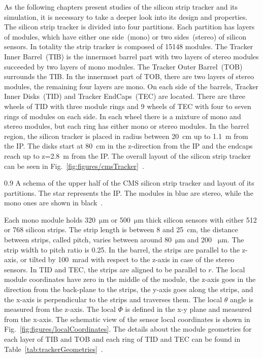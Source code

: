 As the following chapters present studies of the silicon strip tracker and its simulation, it is necessary to take a deeper look into its design and properties. The silicon strip tracker is divided into four partitions. Each partition has layers of modules, which have either one side~(mono) or two sides~(stereo) of silicon sensors. In totality the strip tracker is composed of 15148 modules. The Tracker Inner Barrel~(TIB) is the innermost barrel part with two layers of stereo modules succeeded by two layers of mono modules. The Tracker Outer Barrel~(TOB) surrounds the TIB. In the innermost part of TOB, there are two layers of stereo modules, the remaining four layers are mono. On each side of the barrels, Tracker Inner Disks~(TID) and Tracker EndCaps~(TEC) are located. There are three wheels of TID with three module rings and 9 wheels of TEC with four to seven rings of modules on each side. In each wheel there is a mixture of mono and stereo modules, but each ring has either mono or stereo modules. In the barrel region, the silicon tracker is placed in radius between 20~cm up to 1.1~m from the IP. The disks start at 80~cm in the z-direction from the IP and the endcaps reach up to z=2.8~m from the IP. The overall layout of the silicon strip tracker can be seen in Fig.~\ref{fig:figures/cmsTracker}~\cite{Chatrchyan:2014fea}.

                 {0.9}       
                 {A schema of the upper half of the CMS silicon strip tracker and layout of its partitions. The star represents the IP. The modules in blue are stereo, while the mono ones are shown in black~\cite{Chatrchyan:2014fea}. }

Each mono module holds 320~$\mathrm{\mu m}$ or 500~$\mathrm{\mu m}$ thick silicon sensors with either 512 or 768 silicon strips.  The strip length is between 8 and 25~cm, the distance between strips, called pitch, varies between around 80~$\mathrm{\mu m}$ and 200 ~$\mathrm{\mu m}$. The strip width to pitch ratio is 0.25. In the barrel, the strips are parallel to the z-axis, or tilted by 100~mrad with respect to the z-axis in case of the stereo sensors. In TID and TEC, the strips are aligned to be parallel to $r$. The local module coordinates have zero in the middle of the module, the z-axis goes in the direction from the back-plane to the strips, the y-axis goes along the strips, and the x-axis is perpendicular to the strips and traverses them. The local $\theta$ angle is measured from the z-axis. The local $\Phi$ is defined in the x-y plane and measured from the x-axis. The schematic view of the sensor local coordinates is shown in Fig.~\ref{fig:figures/localCoordinates}. The details about the module geometries for each layer of TIB and TOB and each ring of TID and TEC can be found in Table~\ref{tab:trackerGeometries}~\cite{website:hephyPage}.


